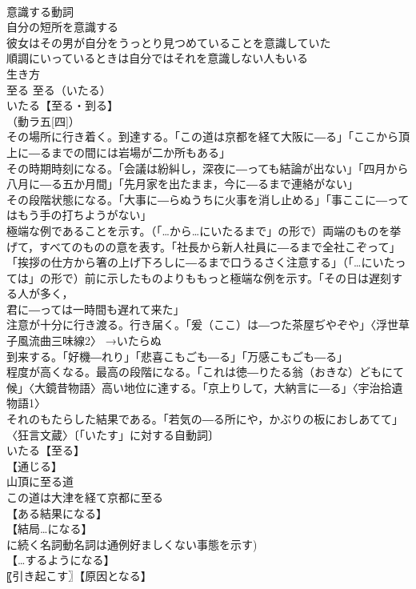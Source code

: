 \documentclass[8pt]{extreport}
\begin{document}
\begin{CJK}{UTF8}{min}
\\	意識する動詞
\\	自分の短所を意識する
\\	彼女はその男が自分をうっとり見つめていることを意識していた
\\	順調にいっているときは自分ではそれを意識しない人もいる
\\	生き方		
\\	至る		至る（いたる）
\\	いたる【至る・到る】
\\	（動ラ五[四]）
\\	その場所に行き着く。到達する。「この道は京都を経て大阪に―る」「ここから頂上に―るまでの間には岩場が二か所もある」
\\	その時期時刻になる。「会議は紛糾し，深夜に―っても結論が出ない」「四月から八月に―る五か月間」「先月家を出たまま，今に―るまで連絡がない」
\\	その段階状態になる。「大事に―らぬうちに火事を消し止める」「事ここに―ってはもう手の打ちようがない」
\\	極端な例であることを示す。（「…から…にいたるまで」の形で）両端のものを挙げて，すべてのものの意を表す。「社長から新人社員に―るまで全社こぞって」「挨拶の仕方から箸の上げ下ろしに―るまで口うるさく注意する」（「…にいたっては」の形で）前に示したものよりももっと極端な例を示す。「その日は遅刻する人が多く，
\\	君に―っては一時間も遅れて来た」
\\	注意が十分に行き渡る。行き届く。「爰（ここ）は―つた茶屋ぢやぞや」〈浮世草子風流曲三味線2〉 →いたらぬ
\\	到来する。「好機―れり」「悲喜こもごも―る」「万感こもごも―る」
\\	程度が高くなる。最高の段階になる。「これは徳―りたる翁（おきな）どもにて候」〈大鏡昔物語〉高い地位に達する。「京上りして，大納言に―る」〈宇治拾遺物語1〉
\\	それのもたらした結果である。「若気の―る所にや，かぶりの板におしあてて」〈狂言文蔵〉〔「いたす」に対する自動詞〕
\\	いたる【至る】
\\	【通じる】
\\	山頂に至る道
\\	この道は大津を経て京都に至る
\\	【ある結果になる】
\\	【結局…になる】
\\	に続く名詞動名詞は通例好ましくない事態を示す) 
\\	【…するようになる】
\\	〖引き起こす〗【原因となる】

\end{CJK}
\end{document}
